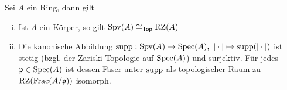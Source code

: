 \begin{lemma}
    Sei $A$ ein Ring, dann gilt 
    \begin{enumerate}[(i)]
        \item Ist $A$ ein Körper, so gilt $\operatorname{Spv}(A) \cong_{\mathsf{Top}} \operatorname{RZ}(A)$
        \item Die kanonische Abbildung $\operatorname{supp} : \operatorname{Spv}(A) \to \operatorname{Spec}(A),\ \vert\cdot\vert \mapsto \operatorname{supp}(\vert\cdot\vert)$ ist stetig (bzgl. der Zariski-Topologie auf $\operatorname{Spec}(A)$) und surjektiv. Für jedes $\mathfrak{p}\in \operatorname{Spec}(A)$ ist dessen Faser unter $\operatorname{supp}$ als topologischer Raum zu $\operatorname{RZ}(\operatorname{Frac}(A/\mathfrak{p}))$ isomorph.
    \end{enumerate}
\end{lemma}